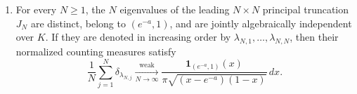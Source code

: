 \begin{theorem}
\begin{enumerate}
\begin{equation}
 J=
 \begin{pmatrix}
 \alpha_0&\sqrt{\beta_1}&&\\
 \sqrt{\beta_1}&\alpha_1&\sqrt{\beta_2}&\\
 &\sqrt{\beta_2}&\alpha_2&\ddots\\
 &&\ddots&\ddots
 \end{pmatrix}
\end{equation}
defines a bounded self-adjoint operator on $\ell^2(\mathbb N_0)$.
It has simple purely absolutely continuous spectrum
\[
 \sigma(J)=[e^{-a},1]
\]
of multiplicity one.
Its monic recurrence coefficients lie in the Nevai class of this interval:
\begin{equation}\label{eq:positive-ein-Nevai}
 \alpha_n\longrightarrow\frac{1+e^{-a}}2,
 \qquad
 \beta_n\longrightarrow\frac{(1-e^{-a})^2}{16}.
\end{equation}
\item For every $N\geq1$, the $N$ eigenvalues of the leading
$N\times N$ principal truncation $J_N$ are distinct, belong to
$(e^{-a},1)$, and are jointly algebraically independent over $K$.
If they are denoted in increasing order by
$\lambda_{N,1},\ldots,\lambda_{N,N}$, then their normalized counting
measures satisfy
\begin{equation}\label{eq:positive-ein-arcsine}
 \frac1N\sum_{j=1}^N\delta_{\lambda_{N,j}}
 \xrightarrow[N\to\infty]{\mathrm{weak}}
 \frac{\mathbf 1_{(e^{-a},1)}(x)}
 {\pi\sqrt{(x-e^{-a})(1-x)}}\,dx.
\end{equation}
\end{enumerate}
\end{theorem}

